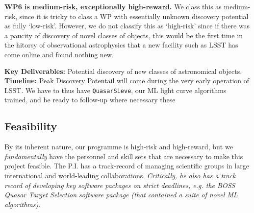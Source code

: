 \smallskip
\smallskip
\noindent
{\bf WP6 is medium-risk, exceptionally high-reward.}  We class this as
medium-risk, since it is tricky to class a WP with essentially unknown
discovery potential as fully `low-risk'. However, we do not classify
this as `high-risk' since if there was a paucity of discovery of novel
classes of objects, this would be the first time in the hitorsy of
observational astrophysics that a new facility such as LSST has come
online and found nothing new.  

\smallskip
\smallskip
\noindent
{\bf Key Deliverables:} Potential
discovery of new classes of astronomical objects.
{\bf Timeline:} Peak Discovery Potentail will come during the 
very early operation of LSST. We have to thus have {\tt QuasarSieve}, 
our ML light curve algorithms trained, and be ready 
to follow-up where necessary these 


\medskip  \medskip \smallskip \smallskip \noindent
\subsection{Feasibility}

\smallskip
\smallskip
\noindent
By its inherent nature, our programme is high-risk and high-reward, but
we {\it fundamentally} have the personnel and skill sets that are 
necessary to make this project feasible. 
The P.I. has a track-record of managing scientific groups in 
large international and world-leading collaborations. {\it Critically, 
he also has a track record of developing key software packages 
on strict deadlines, e.g. the BOSS Quasar Target Selection software 
package (that contained a suite of novel ML algorithms).}
%
%

%
%




